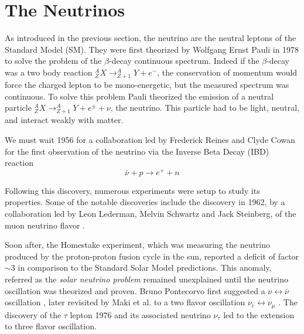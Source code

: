 \section{The Neutrinos}
\label{sec:neutrino:th}

As introduced in the previous section, the neutrino are the neutral leptons of the Standard Model (SM). They were first theorized by Wolfgang Ernst Pauli in 1978 \cite{pauli_dear_1978} to solve the problem of the $\beta$-decay continuous spectrum. Indeed if the $\beta$-decay was a two body reaction $^A_Z X \rightarrow ^A_{Z + 1}Y + e^{-}$, the conservation of momentum would force the charged lepton to be mono-energetic, but the measured spectrum was continuous. To solve this problem Pauli theorized the emission of a neutral particle $^A_Z X \rightarrow ^A_{Z + 1}Y + e^{\pm} + \nu$, the neutrino. This particle had to be light, neutral, and interact weakly with matter.

We must wait 1956 for a collaboration led by Frederick Reines and Clyde Cowan for the first observation of the neutrino \cite{reines_neutrino_1956, cowan_detection_1956} via the Inverse Beta Decay (IBD) reaction
\begin{equation}
  \bar{\nu} + p \rightarrow e^+ + n
\end{equation}

Following this discovery, numerous experiments were setup to study its properties. Some of the notable discoveries include the discovery in 1962, by a collaboration led by Leon Lederman, Melvin Schwartz and Jack Steinberg, of the muon neutrino flavor \cite{danby_observation_1962}.

Soon after, the Homestake experiment, which was measuring the neutrino produced by the proton-proton fusion cycle in the sun, reported a deficit of factor $\sim 3$ \cite{davis_review_1994} in comparison to the Standard Solar Model predictions. This anomaly, referred as the \textit{solar neutrino problem} remained unexplained until the neutrino oscillation was theorized and proven. Bruno Pontecorvo first suggested a $\nu \leftrightarrow \bar{\nu}$ oscillation \cite{pontecorvo_mesonium_1957}, later revisited by Maki et al. to a two flavor oscillation $\nu_e \leftrightarrow \nu_\mu$ \cite{maki_remarks_1962}. The discovery of the $\tau$ lepton 1976 \cite{perl_evidence_1975} and its associated neutrino $\nu_\tau$ \cite{kodama_observation_2001} led to the extension to three flavor oscillation.

